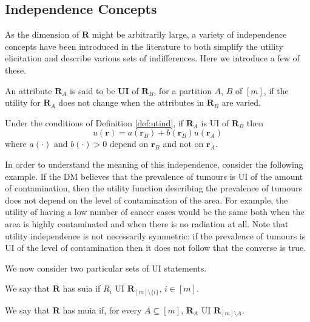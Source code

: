 \subsection{Independence Concepts}
As the dimension of $\bm{R}$ might be arbitrarily large, a variety of independence concepts have been introduced in the literature to both simplify the utility elicitation and describe various sets of indifferences. Here we introduce a few of these.

\begin{definition}
\label{def:utind}
An attribute $\bm{R}_A$ is said to be \textbf{\gls{UI}} of $\bm{R}_B$, for a partition $A$, $B$ of $[m]$, if the utility for $\bm{R}_A$ does not change when the attributes in $\bm{R}_B$ are varied.
\end{definition}

\begin{proposition}
Under the conditions of Definition \ref{def:utind}, if $\bm{R}_A$ is \gls{UI} of $\bm{R}_B$ then
\begin{equation*}
\label{eq:utilityindependence}
u(\bm{r})=a(\bm{r}_B)+b(\bm{r}_B)u(\bm{r}_A)
\end{equation*}
where $a(\cdot)$ and $b(\cdot)>0$ depend on $\bm{r}_{B}$ and not on $\bm{r}_A$. 
\end{proposition}

In order to understand the meaning of this independence, consider the following example. If the \gls{DM} believes that the prevalence of tumours is \gls{UI} of the amount of contamination, then the utility function describing the prevalence of tumours does not depend on the level of contamination of the area. For example, the utility of having a low number of cancer cases would be the same both when the area is highly contaminated and when there is no radiation at all. Note that utility independence is not necessarily symmetric: if the prevalence of tumours is \gls{UI} of the level of contamination then it does not follow that the converse is true.

We now consider two particular sets of \gls{UI} statements.

\begin{definition}
We say that $\bm{R}$ has \gls{suia} if  $R_i$ \gls{UI} $\bm{R}_{[m]\setminus \{i\}}$, $i\in[m]$.
\end{definition}

\begin{definition}
We say that $\bm{R}$ has \gls{muia} if, for every $A\subseteq[m]$, $\bm{R}_A$ \gls{UI} $\bm{R}_{[m]\setminus A}$.
\end{definition}

